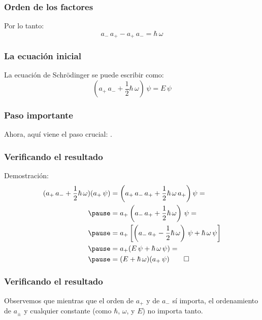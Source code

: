 \documentclass[12pt]{beamer}
\begin{document}
\begin{frame}
\frametitle{Orden de los factores}
Por lo tanto:
\pause
\begin{equation}
a_{-} \, a_{+} - a_{+} \, a_{-} = \hbar \, \omega
\label{eq:ecuacion_02_045}
\end{equation}
\end{frame}
\begin{frame}
\frametitle{La ecuación inicial}
La ecuación de Schrödinger se puede escribir como:
\pause
\begin{equation}
(a_{+} \, a_{-} + \dfrac{1}{2} \hbar \, \omega) \, \psi = E \, \psi
\label{eq:ecuacion_02_046}
\end{equation}
\end{frame}
\begin{frame}
\frametitle{Paso importante}
Ahora, aquí viene el paso crucial: \pause {}.
\end{frame}
\begin{frame}
\frametitle{Verificando el resultado}
Demostración:
\pause
\begin{eqnarray*}
\begin{aligned}
(a_{+} \, a_{-} + \dfrac{1}{2} \hbar \, \omega) (a_{+} \, \psi) &= \left( a_{+} \, a_{-} \, a_{+} + \dfrac{1}{2} \hbar \, \omega \, a_{+} \right) \psi = \\ \pause
&= a_{+} \left( a_{-} \, a_{+} + \dfrac{1}{2} \hbar \, \omega \right) \, \psi = \\ \pause
&= a_{+} \left[ \left( a_{-} \, a_{+} - \dfrac{1}{2} \hbar \, \omega \right) \, \psi + \hbar \, \omega \, \psi \right] \\ \pause
&= a_{+} (E \, \psi + \hbar \, \omega \, \psi) = \\ \pause
&= (E + \hbar \, \omega) (a_{+} \, \psi) \qed
\end{aligned}
\end{eqnarray*}
\end{frame}
\begin{frame}
\frametitle{Verificando el resultado}
Observemos que mientras que el orden de $a_{+}$ y de $a_{-}$ sí importa, \pause el ordenamiento de $a_{\pm}$ y cualquier constante (como $\hbar$, $\omega$, y $E$) no importa tanto.
\end{frame}
\end{document}
